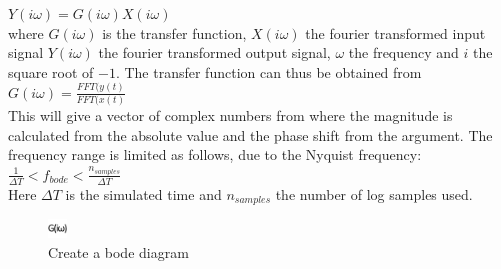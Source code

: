 $Y(i\omega)=G(i\omega)X(i\omega)$ \\

where $G(i\omega)$ is the transfer function, $X(i\omega)$ the fourier transformed input signal  $Y(i\omega)$ the fourier transformed output signal, $\omega$ the frequency and $i$ the square root of $-1$. The transfer function can thus be obtained from\\

$G(i\omega)=\frac{FFT(y(t)}{FFT(x(t)}$\\

This will give a vector of complex numbers from where the magnitude is calculated from the absolute value and the phase shift from the argument. The frequency range is limited as follows, due to the Nyquist frequency: \\

$\frac{1}{\Delta T}<f_{bode}<\frac{n_{samples}}{\Delta T}$\\

Here $\Delta T$ is the simulated time and $n_{samples}$ the number of log samples used.


\begin{figure}
  \includegraphics[width=5mm]
    {../../HopsanGUI/graphics/uiicons/Hopsan-TransferFunctionAnalysis.png}%
  \caption*{Create a bode diagram}
\end{figure}



